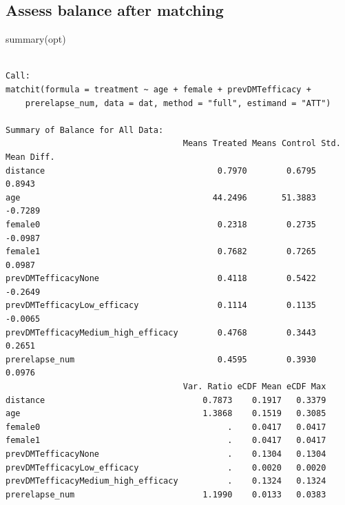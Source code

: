 \documentclass[
  letterpaper,
  DIV=11,
  numbers=noendperiod]{scrreprt}
\newenvironment{Shaded}{\begin{snugshade}}{\end{snugshade}}
\newcommand{\FunctionTok}[1]{\textcolor[rgb]{0.28,0.35,0.67}{#1}}
\newcommand{\NormalTok}[1]{\textcolor[rgb]{0.00,0.23,0.31}{#1}}
\begin{document}
\hypertarget{assess-balance-after-matching}{%
\subsection{Assess balance after
matching}\label{assess-balance-after-matching}}

\begin{Shaded}
\begin{Highlighting}[]
\FunctionTok{summary}\NormalTok{(opt)}
\end{Highlighting}
\end{Shaded}

\begin{verbatim}

Call:
matchit(formula = treatment ~ age + female + prevDMTefficacy + 
    prerelapse_num, data = dat, method = "full", estimand = "ATT")

Summary of Balance for All Data:
                                    Means Treated Means Control Std. Mean Diff.
distance                                   0.7970        0.6795          0.8943
age                                       44.2496       51.3883         -0.7289
female0                                    0.2318        0.2735         -0.0987
female1                                    0.7682        0.7265          0.0987
prevDMTefficacyNone                        0.4118        0.5422         -0.2649
prevDMTefficacyLow_efficacy                0.1114        0.1135         -0.0065
prevDMTefficacyMedium_high_efficacy        0.4768        0.3443          0.2651
prerelapse_num                             0.4595        0.3930          0.0976
                                    Var. Ratio eCDF Mean eCDF Max
distance                                0.7873    0.1917   0.3379
age                                     1.3868    0.1519   0.3085
female0                                      .    0.0417   0.0417
female1                                      .    0.0417   0.0417
prevDMTefficacyNone                          .    0.1304   0.1304
prevDMTefficacyLow_efficacy                  .    0.0020   0.0020
prevDMTefficacyMedium_high_efficacy          .    0.1324   0.1324
prerelapse_num                          1.1990    0.0133   0.0383


\end{verbatim}
\end{document}
